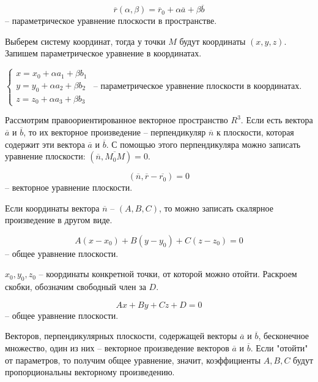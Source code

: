 	\begin{Def}
		$$\overline{r} (\alpha, \beta) = \overline{r}_0 + \alpha \overline{a} + \beta \overline{b}$$ -- параметрическое уравнение плоскости в пространстве.
	\end{Def}

	Выберем систему координат, тогда у точки $M$ будут координаты $(x, y, z)$. Запишем параметрическое уравнение в координатах.

	\begin{Def}
		$ \begin{cases}
			x = x_0 + \alpha a_1 +  \beta b_1\\
			y = y_0 + \alpha a_2 + \beta b_2 \\
			z = z_0 + \alpha a_3 + \beta b_3
		\end{cases} $ -- параметрическое уравнение плоскости в координатах.
	\end{Def}

	Рассмотрим правоориентированное векторное пространство $R^3$. Если есть вектора $\overline{a}$ и $\overline{b}$, то их векторное произведение -- перпендикуляр $\overline{n}$ к плоскости, которая содержит эти вектора $\overline{a}$ и $\overline{b}$. С помощью этого перпендикуляра можно записать уравнение плоскости: $(\overline{n}, \overline{M_0M}) = 0$.

	\begin{Def}
		$$(\overline{n}, \overline{r} - \overline{r_0}) = 0$$ -- векторное уравнение плоскости.
	\end{Def}

	\begin{figure*}[h]
		\centering
		\def\svgwidth{0.4\columnwidth}
		
	\end{figure*}

	Если координаты вектора $\overline{n}$ -- $(A, B, C)$, то можно записать скалярное произведение в другом виде.

	\begin{Def}
		$$A(x- x_0) + B(y - y_0) + C(z - z_0) = 0$$ -- общее уравнение плоскости.
	\end{Def}

	$x_0,  y_0, z_0$ -- координаты конкретной точки, от которой можно отойти. Раскроем скобки, обозначим свободный член за $D$.
	
	\begin{Def}
		$$Ax + By + Cz + D = 0$$ -- общее уравнение плоскости.
	\end{Def}

	Векторов, перпендикулярных плоскости, содержащей векторы $\overline{a}$ и $\overline{b}$, бесконечное множество, один из них -- векторное произведение векторов $\overline{a}$ и $\overline{b}$. Если "отойти"  от параметров, то получим общее уравнение, значит, коэффициенты $A, B, C$ будут пропорциональны векторному произведению.  

